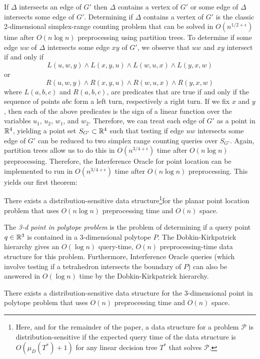 \documentclass{patmorin}
\begin{document}
If $\Delta$ intersects an edge of $G'$ then $\Delta$ contains a vertex of
$G'$ or some edge of $\Delta$ intersects some edge of $G'$.  Determining if
$\Delta$ contains a vertex of $G'$ is the classic 2-dimensional
simplex-range counting problem that can be solved in $O(n^{1/2+\epsilon})$
time after $O(n\log n)$ preprocessing using partition trees.  To determine
if some edge $uw$ of $\Delta$ intersects some edge $xy$ of $G'$, we observe
that $uw$ and $xy$ intersect if and only if
\[ L(u,w,y) \wedge L(x,y,u) \wedge L(w,u,x) \wedge L(y,x,w) \]
or
\[ R(u,w,y) \wedge R(x,y,u) \wedge R(w,u,x) \wedge R(y,x,w) \]
where $L(a,b,c)$ and $R(a,b,c)$, are predicates that are true if and
only if the sequence of points $abc$ form a left turn, respectively a
right turn.  If we fix $x$ and $y$, then each of the above predicates is
the sign of a linear function over the variables $u_1$, $u_2$, $w_1$,
and $w_2$.  Therefore, we can treat each edge of $G'$ as a point in
$\mathbb{R}^4$, yielding a point set $S_{G'} \subset\mathbb{R}^4$ such that testing if
edge $uw$ intersects some edge of $G'$ can be reduced to two simplex
range counting queries over $S_{G'}$.  Again, partition trees allow us to
do this in $O(n^{3/4+\epsilon})$ time after $O(n\log n)$ preprocessing.
Therefore, the Interference Oracle for point location can be implemented
to run in $O(n^{3/4+\epsilon})$ time after $O(n\log n)$ preprocessing.
This yields our first theorem:

\begin{thm}
  There exists a distribution-sensitive data structure\footnote{Here,
  and for the remainder of the paper, a data structure for a problem
  $\mathcal{P}$ is distribution-sensitive if the expected query time of
  the data structure is $O(\mu_D(T^*)+1)$ for any linear decision tree
  $T^*$ that solves $\mathcal{P}$.}for the planar point location problem
  that uses $O(n\log n)$ preprocessing time and $O(n)$ space.
\end{thm}

The \emph{3-d point in polytope problem} is the problem of determining if
a query point $q\in\mathbb{R}^3$ is contained in a 3-dimensional polytope $P$.
The Dobkin-Kirkpatrick hierarchy \cite{dk83} gives an $O(\log n)$
query-time, $O(n)$ preprocessing-time data structure for this problem.
Furthermore, Interference Oracle queries (which involve testing if a
tetrahedron intersects the boundary of $P$) can also be answered in $O(\log
n)$ time by the Dobkin-Kirkpatrick hierarchy.

\begin{thm}
  There exists a distribution-sensitive data structure for the
  3-dimensional point in polytope problem that uses $O(n)$ preprocessing
  time and $O(n)$ space.
\end{thm}
\end{document}
